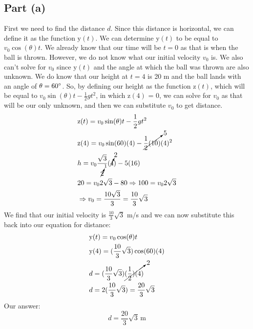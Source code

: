 \documentclass{article}
\newcommand{\y}{\mathrm{y}}
\newcommand{\z}{\mathrm{z}}
\begin{document}
\subsection*{Part (a)}
First we need to find the distance $d$. Since this distance is 
horizontal, we can define it as the function $\y(t)$. We can 
determine $\y(t)$ to be equal to $v_0\cos(\theta)t$. We already know 
that our time will be $t=0$ as that is when the ball is thrown.
However, we do not know what our initial velocity $v_0$ is. 
We also can't solve for $v_0$ since $\y(t)$ and the angle at which the 
ball was thrown are also unknown. We do know that our height at $t=4$ is 
20 m and the ball lands with an angle of $\theta=60\degree$. So, 
by defining our height as the function $\z(t)$, which will be equal to 
$v_0\sin(\theta)t-\frac{1}{2}gt^2$, in which $\z(4)$ = 0, we can solve for $v_0$ as that will be our only unknown,
and then we can substitute $v_0$ to get distance.
\begin{align}
    &\z(t) = v_0\sin(\theta)t -\frac{1}{2}gt^2\\
    &\z(4) = v_0\sin(60)(4) -\cancelto{5}{\frac{1}{2}(10)}(4)^2\\
    &h = v_0\frac{\sqrt3}{\cancelto{1}{2}}(\cancelto{2}{4}) - 5(16) \\
    &20 = v_02\sqrt3 - 80 \Rightarrow 100 = v_02\sqrt3\\
    &\Rightarrow v_ 0 = \frac{10\sqrt3}{3} = \frac{10}{3}\sqrt3
\end{align}
We find that our initial velocity is $\frac{10}{3}\sqrt3$ m/s and we can now substitute 
this back into our equation for distance:
\begin{align}
    &\y(t) = v_0\cos(\theta)t \\
    &\y(4) = (\frac{10}{3}\sqrt3)\cos(60)(4) \\
    &d = (\frac{10}{3}\sqrt3)\cancelto{2}{(\frac{1}{2})(4)} \\
    &d = 2(\frac{10}{3}\sqrt3) = \frac{20}{3}\sqrt3
\end{align}
Our answer:
\[\boxed{d = \frac{20}{3}\sqrt3\,\mathrm{m}}\]
\end{document}
